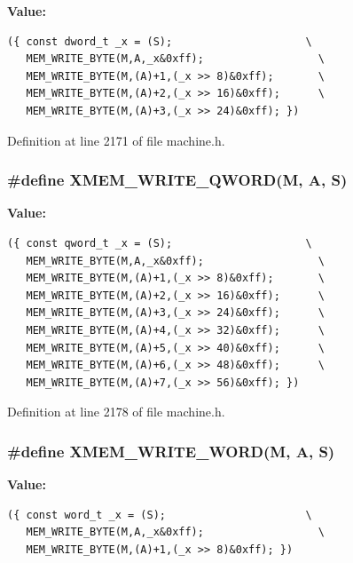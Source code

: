 \textbf{Value:}

\begin{Code}\begin{verbatim}({ const dword_t _x = (S);                     \
   MEM_WRITE_BYTE(M,A,_x&0xff);                  \
   MEM_WRITE_BYTE(M,(A)+1,(_x >> 8)&0xff);       \
   MEM_WRITE_BYTE(M,(A)+2,(_x >> 16)&0xff);      \
   MEM_WRITE_BYTE(M,(A)+3,(_x >> 24)&0xff); })
\end{verbatim}
\end{Code}


Definition at line 2171 of file machine.h.
\subsubsection[{XMEM\_\-WRITE\_\-QWORD}]{\setlength{\rightskip}{0pt plus 5cm}\#define XMEM\_\-WRITE\_\-QWORD(M, \/  A, \/  S)}\label{machine_8h_d50044c29d7db0d50498c1b6c9281739}


\textbf{Value:}

\begin{Code}\begin{verbatim}({ const qword_t _x = (S);                     \
   MEM_WRITE_BYTE(M,A,_x&0xff);                  \
   MEM_WRITE_BYTE(M,(A)+1,(_x >> 8)&0xff);       \
   MEM_WRITE_BYTE(M,(A)+2,(_x >> 16)&0xff);      \
   MEM_WRITE_BYTE(M,(A)+3,(_x >> 24)&0xff);      \
   MEM_WRITE_BYTE(M,(A)+4,(_x >> 32)&0xff);      \
   MEM_WRITE_BYTE(M,(A)+5,(_x >> 40)&0xff);      \
   MEM_WRITE_BYTE(M,(A)+6,(_x >> 48)&0xff);      \
   MEM_WRITE_BYTE(M,(A)+7,(_x >> 56)&0xff); })
\end{verbatim}
\end{Code}


Definition at line 2178 of file machine.h.
\subsubsection[{XMEM\_\-WRITE\_\-WORD}]{\setlength{\rightskip}{0pt plus 5cm}\#define XMEM\_\-WRITE\_\-WORD(M, \/  A, \/  S)}\label{machine_8h_90f19c73c68d2daa9231b533043aa6e4}


\textbf{Value:}

\begin{Code}\begin{verbatim}({ const word_t _x = (S);                      \
   MEM_WRITE_BYTE(M,A,_x&0xff);                  \
   MEM_WRITE_BYTE(M,(A)+1,(_x >> 8)&0xff); })
\end{verbatim}
\end{Code}


